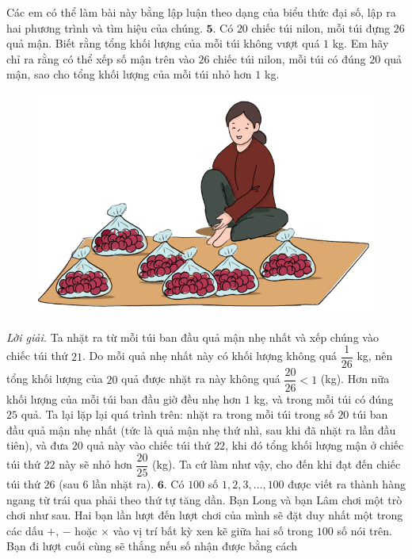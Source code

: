 \begin{multicols}{2}
	\vskip 0.1cm
	Các em có thể làm bài này bằng lập luận theo dạng của biểu thức đại số, lập ra hai phương trình và tìm hiệu của chúng.
	\vskip 0.1cm
	$\pmb{5.}$ Có $20$ chiếc túi nilon, mỗi túi đựng $26$ quả mận. Biết rằng tổng khối lượng của mỗi túi không vượt quá $1$ kg. Em hãy chỉ ra rằng có thể xếp số mận trên vào $26$ chiếc túi nilon, mỗi túi có đúng $20$ quả mận, sao cho tổng khối lượng của mỗi túi nhỏ hơn $1$ kg.
	\begin{figure}[H]
		\centering
		\vspace*{-10pt}
		\captionsetup{labelformat= empty, justification=centering}
		\includegraphics[width=0.85\linewidth]{Pi9_bai5}
		\vspace*{-10pt}
	\end{figure}
	\textit{Lời giải.} 	Ta nhặt ra từ mỗi túi ban đầu quả mận nhẹ nhất và xếp chúng vào chiếc túi thứ $21$. Do mỗi quả nhẹ nhất này có khối lượng không quá $\dfrac{1}{26}$ kg, nên tổng khối lượng của $20$ quả được nhặt ra này không quá $\dfrac{20}{26} <1$ (kg). Hơn nữa khối lượng của mỗi túi ban đầu giờ đều nhẹ hơn $1$ kg, và trong mỗi túi có đúng $25$ quả. Ta lại lặp lại quá trình trên: nhặt ra trong mỗi túi trong số $20$ túi ban đầu quả mận nhẹ nhất (tức là quả mận nhẹ thứ nhì, sau khi đã nhặt ra lần đầu tiên), và đưa $20$ quả này vào chiếc túi thứ $22$, khi đó tổng khối lượng mận ở chiếc túi thứ $22$ này sẽ nhỏ hơn $\dfrac{20}{25}$ (kg). Ta cứ làm như vậy, cho đến khi đạt đến chiếc túi thứ $26$ (sau $6$ lần nhặt ra).
	\vskip 0.1cm
	$\pmb{6.}$ 	Có $100$ số $1, 2, 3, \ldots, 100$ được viết ra thành hàng ngang từ trái qua phải theo thứ tự tăng dần. Bạn Long và bạn Lâm chơi một trò chơi như sau. Hai bạn lần lượt đến lượt chơi của mình sẽ đặt duy nhất một trong các dấu $+$, $-$ hoặc $\times$ vào vị trí bất kỳ xen kẽ giữa hai số trong $100$ số nói trên. Bạn đi lượt cuối cùng sẽ thắng nếu số nhận được bằng cách 

\end{multicols}
